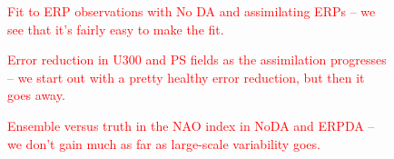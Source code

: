 \documentclass[draft,jgrga]{agutex}
\begin{document}
\begin{article}
\begin{thebibliography}{}
\end{thebibliography}



%

%
%
\end{article}
\newpage
%
%
%


 \begin{figure}
 \caption{\textcolor{red}{Fit to ERP observations with No DA and assimilating ERPs -- we see that it's fairly easy to make the fit.}}
 \label{fig:ERPs}
\end{figure}

 \begin{figure}
 \caption{\textcolor{red}{Error reduction in U300 and PS fields as the assimilation progresses -- we start out with a pretty healthy error reduction, but then it goes away.}}
 \label{fig:ER_state_space}
\end{figure}

 \begin{figure}
 \caption{\textcolor{red}{Ensemble versus truth in the NAO index in NoDA and ERPDA -- we don't gain much as far as large-scale variability goes.}}
 \label{fig:NAO}
\end{figure}
\end{document}
